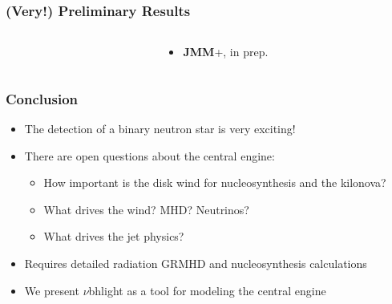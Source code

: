 \documentclass[]{beamer}
\newcommand{\backupbegin}{
   \newcounter{finalframe}
   \setcounter{finalframe}{\value{framenumber}}
}
\newcommand{\backupend}{
   \setcounter{framenumber}{\value{finalframe}}
}
\begin{document}
\begin{frame}
  \frametitle{(Very!) Preliminary Results}
  \begin{columns}
    \begin{column}{8cm}
      \begin{center}
      \end{center}
    \end{column}
    \begin{column}{4cm}
      \begin{center}
        \begin{itemize}
          \item \textbf{JMM}+, in prep. 
        \end{itemize}
      \end{center}
    \end{column}
  \end{columns}
\end{frame}

\begin{frame}
  \frametitle{Conclusion}
  \begin{itemize}
  \item The detection of a binary neutron star is very exciting!
  \item There are open questions about the central engine:
    \begin{itemize}
    \item How important is the disk wind for nucleosynthesis and the kilonova?
    \item What drives the wind? MHD? Neutrinos?
    \item What drives the jet physics?
    \end{itemize}
    \item Requires detailed radiation GRMHD and nucleosynthesis calculations
    \item We present $\nu$bhlight as a tool for modeling the central engine
  \end{itemize}
\end{frame}

\backupbegin
\backupend
\end{document}
